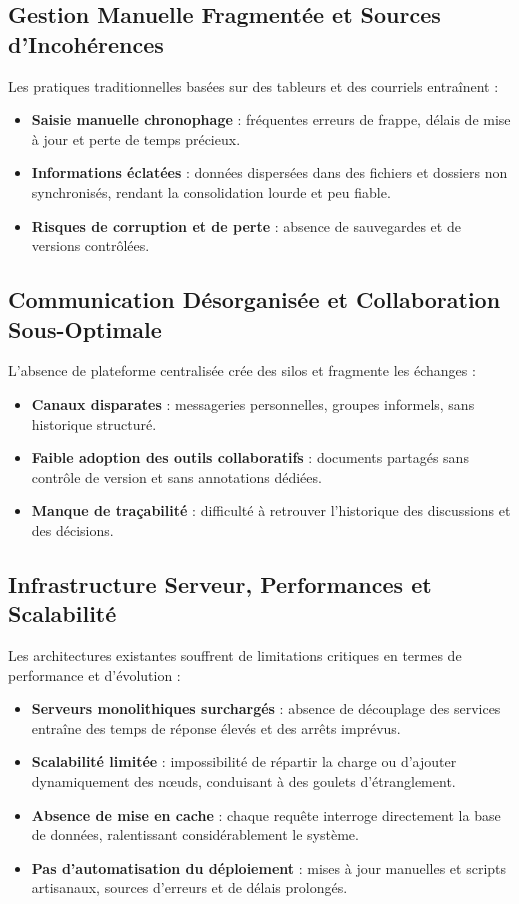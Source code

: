 \documentclass[12pt]{rapportPfe}
\begin{document}
\subsection{Gestion Manuelle Fragmentée et Sources d’Incohérences}
Les pratiques traditionnelles basées sur des tableurs et des courriels entraînent :
\begin{itemize}[itemsep=1em]
  \item \textbf{Saisie manuelle chronophage} : fréquentes erreurs de frappe, délais de mise à jour et perte de temps précieux.
  \item \textbf{Informations éclatées} : données dispersées dans des fichiers et dossiers non synchronisés, rendant la consolidation lourde et peu fiable.
  \item \textbf{Risques de corruption et de perte} : absence de sauvegardes et de versions contrôlées.
\end{itemize}

\subsection{Communication Désorganisée et Collaboration Sous-Optimale}
L’absence de plateforme centralisée crée des silos et fragmente les échanges :
\begin{itemize}[itemsep=1em]
  \item \textbf{Canaux disparates} : messageries personnelles, groupes informels, sans historique structuré.
  \item \textbf{Faible adoption des outils collaboratifs} : documents partagés sans contrôle de version et sans annotations dédiées.
  \item \textbf{Manque de traçabilité} : difficulté à retrouver l’historique des discussions et des décisions.
\end{itemize}

\subsection{Infrastructure Serveur, Performances et Scalabilité}
Les architectures existantes souffrent de limitations critiques en termes de performance et d’évolution :
\begin{itemize}[itemsep=1em]
  \item \textbf{Serveurs monolithiques surchargés} : absence de découplage des services entraîne des temps de réponse élevés et des arrêts imprévus.
  \item \textbf{Scalabilité limitée} : impossibilité de répartir la charge ou d’ajouter dynamiquement des nœuds, conduisant à des goulets d’étranglement.
  \item \textbf{Absence de mise en cache} : chaque requête interroge directement la base de données, ralentissant considérablement le système.
  \item \textbf{Pas d’automatisation du déploiement} : mises à jour manuelles et scripts artisanaux, sources d’erreurs et de délais prolongés.
\end{itemize}
\end{document}
